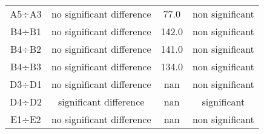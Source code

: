 \begin{table}[H]
\begin{tabular}{|c|c|c|c|}
A5÷A3 & no significant difference & 77.0 & non significant \\ 
B4÷B1 & no significant difference & 142.0 & non significant \\ 
B4÷B2 & no significant difference & 141.0 & non significant \\ 
B4÷B3 & no significant difference & 134.0 & non significant \\ 
D3÷D1 & no significant difference & nan & non significant \\ 
D4÷D2 & significant difference & nan & significant \\ 
E1÷E2 & no significant difference & nan & non significant \\ 
\hline
\end{tabular}
\end{table}


\normalsize 